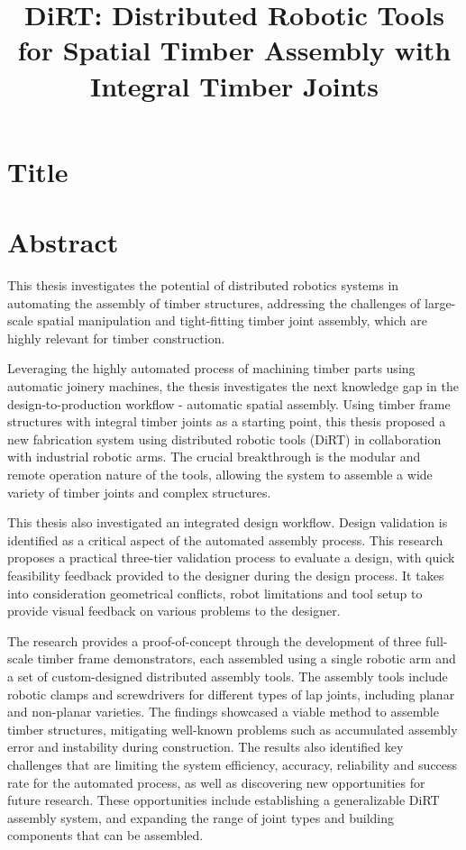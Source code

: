 \documentclass[11pt]{book}
\title{DiRT: Distributed Robotic Tools for Spatial Timber Assembly with Integral Timber Joints}
\begin{document}
\maketitle

\section{Title}

\section{Abstract}

This thesis investigates the potential of distributed robotics systems in automating the assembly of timber structures, addressing the challenges of large-scale spatial manipulation and tight-fitting timber joint assembly, which are highly relevant for timber construction.

Leveraging the highly automated process of machining timber parts using automatic joinery machines, the thesis investigates the next knowledge gap in the design-to-production workflow - automatic spatial assembly. Using timber frame structures with integral timber joints as a starting point, this thesis proposed a new fabrication system using distributed robotic tools (DiRT) in collaboration with industrial robotic arms. The crucial breakthrough is the modular and remote operation nature of the tools, allowing the system to assemble a wide variety of timber joints and complex structures.

This thesis also investigated an integrated design workflow. Design validation is identified as a critical aspect of the automated assembly process. This research proposes a practical three-tier validation process to evaluate a design, with quick feasibility feedback provided to the designer during the design process. It takes into consideration geometrical conflicts, robot limitations and tool setup to provide visual feedback on various problems to the designer. 

The research provides a proof-of-concept through the development of three full-scale timber frame demonstrators, each assembled using a single robotic arm and a set of custom-designed distributed assembly tools. The assembly tools include robotic clamps and screwdrivers for different types of lap joints, including planar and non-planar varieties. The findings showcased a viable method to assemble timber structures, mitigating well-known problems such as accumulated assembly error and instability during construction. The results also identified key challenges that are limiting the system efficiency, accuracy, reliability and success rate for the automated process, as well as discovering new opportunities for future research. These opportunities include establishing a generalizable DiRT assembly system, and expanding the range of joint types and building components that can be assembled.
\end{document}
